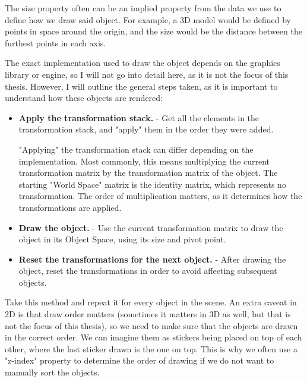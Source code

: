\pagebreak

\begin{Note}
    The size property often can be an implied property from the data we use to define how we draw said object. For example, a 3D model would be defined by points in space around the origin, and the size would be the distance between the furthest points in each axis.
\end{Note}

The exact implementation used to draw the object depends on the graphics library or engine, so I will not go into detail here, as it is not the focus of this thesis. However, I will outline the general steps taken, as it is important to understand how these objects are rendered:

\begin{itemize}
    \item \textbf{Apply the transformation stack.} - Get all the elements in the transformation stack, and "apply" them in the order they were added.
    \begin{Note}
        "Applying" the transformation stack can differ depending on the implementation. Most commonly, this means multiplying the current transformation matrix by the transformation matrix of the object. The starting "World Space" matrix is the identity matrix, which represents no transformation. The order of multiplication matters, as it determines how the transformations are applied.
    \end{Note}

    \item \textbf{Draw the object.} - Use the current transformation matrix to draw the object in its Object Space, using its size and pivot point.

    \item \textbf{Reset the transformations for the next object.} - After drawing the object, reset the transformations in order to avoid affecting subsequent objects.
\end{itemize}

Take this method and repeat it for every object in the scene. An extra caveat in 2D is that draw order matters (sometimes it matters in 3D as well, but that is not the focus of this thesis), so we need to make sure that the objects are drawn in the correct order. We can imagine them as stickers being placed on top of each other, where the last sticker drawn is the one on top. This is why we often use a "z-index" property to determine the order of drawing if we do not want to manually sort the objects.

\pagebreak


